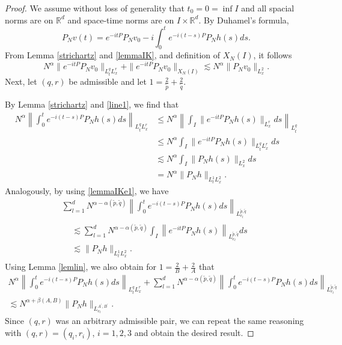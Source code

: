 \documentclass[10pt,leqno]{amsart}
\newcommand{\R}{\mathbb{R}}
\numberwithin{equation}{section}
\begin{document}
\begin{proof}
We assume without loss of generality that $t_0 = 0=\inf I$ and all spacial norms are on $\R^d$ and space-time norms are on $I \times \R^d$. By Duhamel's formula,
$$P_N v(t)= e^{-it P}P_N v_0 - i \int_0^t e^{-i(t-s) P} P_N h(s) ds. $$
From Lemma \ref{strichartz} and \ref{lemmaIK}, and definition of $X_N(I)$, it follows
$$N^\alpha \|e^{-it P} P_N v_0 \|_{L_t^q L_x^r } + \|e^{-it P} P_N v_0 \|_{X_N (I)} \lesssim N^\alpha \|P_N v_0\|_{L_x^2}.$$
Next, let $(q, r)$ be  admissible and let $1= \frac{2}{\tilde{p}} +\frac{2}{\tilde{q}}$. 


By Lemma \ref{strichartz} and \eqref{line1}, we find that 
\begin{align*}
N^\alpha  \left\|\int_0^t e^{-i(t-s) P} P_N h(s) ds\right\|_{L_t^q L_x^r } 
 &\leq N^\alpha  \left\|\int_I \|e^{- i t P} P_N h(s)\|_{L_x^r} ds\right\|_{L_t^q} 
 \\
 &\leq N^\alpha  
\int_I \|e^{- i t P} P_N h(s)\|_{L_t^qL_x^r} ds
\\
& \lesssim N^\alpha \int_I \|P_N h(s)\|_{L^2_x} ds \\
&= N^\alpha  \|P_N h\|_{L^1_tL^2_x}.
\end{align*}
Analogously, by using \eqref{lemmaIKe1}, we have
\begin{multline*}
\sum_{l=1}^d N^{\alpha -\alpha (\tilde{p},\tilde q)} \left\|\int_0^t e^{-i(t-s) P} P_N h(s) ds\right\|_{L_{e_l}^{\tilde{p},\tilde q}  } \\
\begin{aligned}
 & \lesssim 
 \sum_{l=1}^d N^{\alpha -\alpha (\tilde{p},\tilde q)} \int_I \left\| e^{-it P} P_N h(s) \right\|_{L_{e_l}^{\tilde{p},\tilde q}  } ds \\
 &\lesssim \|P_N h\|_{L^1_tL^2_x}.
\end{aligned}
\end{multline*}
Using Lemma \ref{lemlin}, we also obtain for $1= \frac{2}{B} +\frac{2}{A}$ that
\begin{multline*}
N^\alpha  \left\|\int_0^t e^{-i(t-s) P} P_N h(s) ds\right\|_{L_t^q L_x^r} + \sum_{l=1}^d N^{\alpha -\alpha (\tilde{p},\tilde q )}   
\left\|\int_0^t e^{-i(t-s) P} P_N h(s) ds\right\|_{L_{e_l}^{\tilde{p},\tilde q}  }\\
 \lesssim N^{\alpha +\beta (A,B)}  \|P_N h\|_{L_{e_l}^{A^\prime ,B^\prime} } .
\end{multline*}
Since $(q, r)$ was an arbitrary admissible pair, we can repeat the same reasoning with $(q, r) = (q_i, r_i)$, $i = 1, 2, 3$ and obtain the desired result.
\end{proof}
\end{document}
